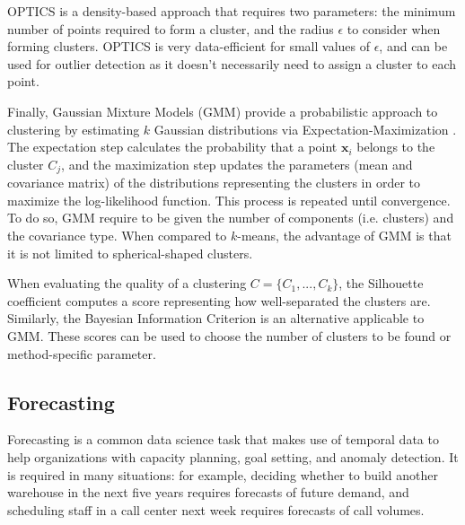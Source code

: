 \documentclass[a4paper, 12pt]{article} %
\begin{document}
	OPTICS \cite{OPTICS} is a density-based approach that requires two parameters: the minimum number of points required to form a cluster, and the radius $\epsilon$ to consider when forming clusters. OPTICS is very data-efficient for small values of $\epsilon$, and can be used for outlier detection as it doesn't necessarily need to assign a cluster to each point.
	
	Finally, Gaussian Mixture Models (GMM) \cite{MixtureModels} provide a probabilistic approach to clustering by estimating $k$ Gaussian distributions via Expectation-Maximization . The expectation step calculates the probability that a point $\pmb{x}_i$ belongs to the cluster $C_j$, and the maximization step updates the parameters (mean and covariance matrix) of the distributions representing the clusters in order to maximize the log-likelihood function. This process is repeated until convergence. To do so, GMM require to be given the number of components (i.e. clusters) and the covariance type. When compared to $k$-means, the advantage of GMM is that it is not limited to spherical-shaped clusters.
	
	When evaluating the quality of a clustering $C=\{C_1, ..., C_k\}$, the Silhouette coefficient \cite{SilhouetteCoefficient} computes a score representing how well-separated the clusters are. Similarly, the Bayesian Information Criterion \cite{BayesianInformationCriterion} is an alternative applicable to GMM. These scores can be used to choose the number of clusters to be found or method-specific parameter.
	
	\subsection{ Forecasting } \label{sec:forecasting}
	Forecasting is a common data science task that makes use of temporal data \cite{ForecastingSurvey} to help organizations with capacity planning, goal setting, and anomaly detection. It is required in many situations: for example, deciding whether to build another warehouse in the next five years requires forecasts of future demand, and scheduling staff in a call center next week requires forecasts of call volumes.
	
\end{document}
